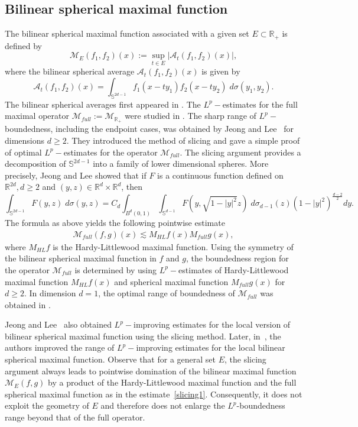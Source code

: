 \documentclass[a4paper,reqno]{amsart}
\numberwithin{equation}{section}
\newcommand{\R}{{\mathbb {R}}}
\begin{document}
	\subsection{Bilinear spherical maximal function}
	The bilinear spherical maximal function associated with a given set $E\subset \R_+$ is defined by
	\[\mathcal{M}_E(f_1,f_2)(x):=\sup_{t\in E}|\mathcal{A}_t(f_1,f_2)(x)|,\]
	where the bilinear spherical average $\mathcal{A}_t(f_1,f_2)(x)$ is given by 
	\[\mathcal{A}_t(f_1,f_2)(x)=\int_{\mathbb S^{2d-1}}f_1(x-ty_1)f_2(x-ty_2)\;d\sigma(y_1,y_2).\]
	The bilinear spherical averages first appeared in \cite{GGIPS}.
	The $L^p-$estimates for the full maximal operator $\mathcal{M}_{full}:=\mathcal{M}_{\R_+}$ were studied in \cites{BGHHO, GHH, HHY}. The sharp range of $L^p-$boundedness, including the endpoint cases, was obtained by Jeong and Lee~\cite{JeongLee} for dimensions $d\geq2$. They introduced the method of slicing and gave a simple proof of optimal $L^p-$estimates for the operator $\mathcal{M}_{full}$. The slicing argument provides a decomposition of  $\mathbb{S}^{2d-1}$ into a family of lower dimensional spheres. More precisely, Jeong and Lee \cite{JeongLee} showed that if $F$ is a continuous function defined
	on $\R^{2d}, d\geq 2$ and $(y,z)\in\R^d\times\R^d$, then
	\begin{equation}\label{slicing}
		\int_{\mathbb{S}^{2d-1}}F(y,z)\;d\sigma(y,z)= C_d \int_{B^d(0,1)}\int_{\mathbb{S}^{d-1}}F(y,\sqrt{1-|y|^2}z)\;d\sigma_{d-1}(z)(1-|y|^2)^{\frac{d-2}{2}}dy.
	\end{equation}
	The formula as above yields the following pointwise estimate
	\begin{align}\label{slicing1}\mathcal{M}_{full}(f,g)(x)\lesssim M_{HL}f(x)M_{full}g(x),	\end{align}
	where $M_{HL}f$ is the Hardy-Littlewood maximal function. Using the symmetry of the bilinear spherical maximal function in $f$ and $g$, the boundedness region for the operator $\mathcal M_{full}$ is determined by using $L^p-$estimates of Hardy-Littlewood maximal function $M_{HL}f(x)$ and spherical maximal function $M_{full}g(x)$ for $d\geq 2$. In dimension $d=1$, the optimal range of boundedness of $\mathcal M_{full}$ was obtained in \cites{ChristZhou, DosidisRamos, BCSS}.
	
	Jeong and Lee~\cite{JeongLee} also obtained $L^p-$improving estimates for the local version of bilinear spherical maximal function using the slicing method. Later, in~\cite{BCSS}, the authors improved the range of $L^p-$improving estimates for the local bilinear spherical maximal function. Observe that for a general set $E$, the slicing argument always leads to pointwise domination of the bilinear maximal function $\mathcal{M}_{E}(f,g)$ by a product of the Hardy-Littlewood maximal function and the full spherical maximal function as in the estimate~\eqref{slicing1}. Consequently, it does not exploit the geometry of $E$ and therefore does not enlarge the $L^p$-boundedness range beyond that of the full operator.
	
\end{document}
